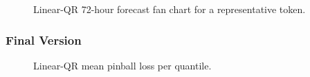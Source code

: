 \documentclass[
  a4paper,
  DIV=11,
  numbers=noendperiod]{scrreprt}
\begin{document}
\begin{figure}


\caption{\label{fig-lqr-fan}Linear-QR 72-hour forecast fan chart for a
representative token.}

\end{figure}%

\subsubsection{Final Version}\label{final-version}

\begin{figure}


\caption{\label{fig-lqr-pinball-mean}Linear-QR mean pinball loss per
quantile.}

\end{figure}%
\end{document}
